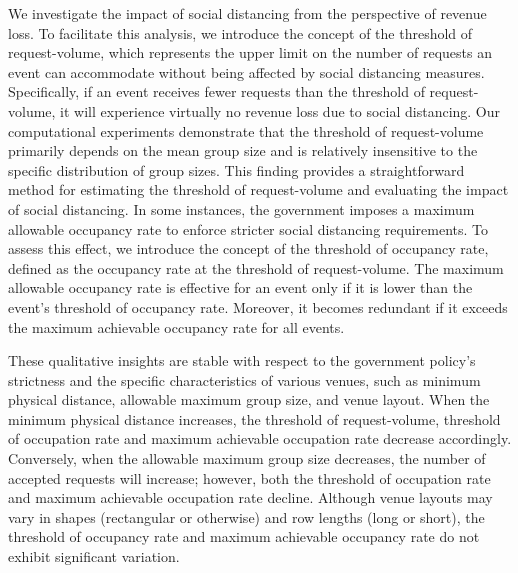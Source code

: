 We investigate the impact of social distancing from the perspective of revenue loss. To facilitate this analysis, we introduce the concept of the threshold of request-volume, which represents the upper limit on the number of requests an event can accommodate without being affected by social distancing measures. Specifically, if an event receives fewer requests than the threshold of request-volume, it will experience virtually no revenue loss due to social distancing. Our computational experiments demonstrate that the threshold of request-volume primarily depends on the mean group size and is relatively insensitive to the specific distribution of group sizes. This finding provides a straightforward method for estimating the threshold of request-volume and evaluating the impact of social distancing.
In some instances, the government imposes a maximum allowable occupancy rate to enforce stricter social distancing requirements. To assess this effect, we introduce the concept of the threshold of occupancy rate, defined as the occupancy rate at the threshold of request-volume. The maximum allowable occupancy rate is effective for an event only if it is lower than the event's threshold of occupancy rate. Moreover, it becomes redundant if it exceeds the maximum achievable occupancy rate for all events.




These qualitative insights are stable with respect to the government policy's strictness and the specific characteristics of various venues, such as minimum physical distance, allowable maximum group size, and venue layout. When the minimum physical distance increases, the threshold of request-volume, threshold of occupation rate and maximum achievable occupation rate decrease accordingly. Conversely, when the allowable maximum group size decreases, the number of accepted requests will increase; however, both the threshold of occupation rate and maximum achievable occupation rate decline. Although venue layouts may vary in shapes (rectangular or otherwise) and row lengths (long or short), the threshold of occupancy rate and maximum achievable occupancy rate do not exhibit significant variation.


